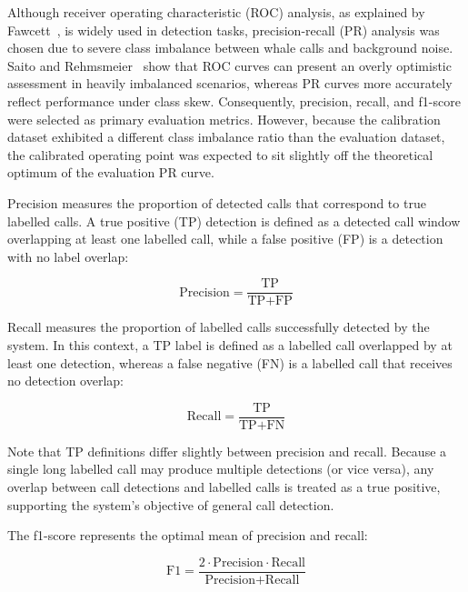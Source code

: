 \label{sec:evaluation-metrics}

Although receiver operating characteristic (\acs{ROC}) analysis, as explained by Fawcett~\cite{roc}, is widely used in detection tasks, precision-recall (\acs{PR}) analysis was chosen due to severe class 
imbalance between whale calls and background noise. Saito and Rehmsmeier~\cite{pr} show that \acs{ROC} curves can present an overly optimistic assessment in heavily imbalanced scenarios, whereas \acs{PR} curves 
more accurately reflect performance under class skew. Consequently, precision, recall, and f1-score were selected as primary evaluation metrics. However, because 
the calibration dataset exhibited a different class imbalance ratio than the evaluation dataset, the calibrated operating point was expected to sit slightly 
off the theoretical optimum of the evaluation \acs{PR} curve.

Precision measures the proportion of detected calls that correspond to true labelled calls. A true positive (\acs{TP}) detection is defined as a detected call 
window overlapping at least one labelled call, while a false positive (\acs{FP}) is a detection with no label overlap:

\begin{equation}
    \text{Precision} = \frac{\text{TP}}{\text{TP} + \text{FP}}
    \label{eq:precision}
\end{equation}

Recall measures the proportion of labelled calls successfully detected by the system. In this context, a \acs{TP} label is defined as a labelled call overlapped 
by at least one detection, whereas a false negative (\acs{FN}) is a labelled call that receives no detection overlap:

\begin{equation}
    \text{Recall} = \frac{\text{TP}}{\text{TP} + \text{FN}}
    \label{eq:recall}
\end{equation}

Note that \acs{TP} definitions differ slightly between precision and recall. Because a single long labelled call may produce multiple detections (or vice versa), any overlap 
between call detections and labelled calls is treated as a true positive, supporting the system's objective of general call detection.

The f1-score represents the optimal mean of precision and recall:

\begin{equation}
    \text{F1} = \frac{2 \cdot \text{Precision} \cdot \text{Recall}}{\text{Precision} + \text{Recall}}
    \label{eq:f1}
\end{equation}


